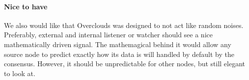 \paragraph{Nice to have} We also would like that Overclouds was designed to not act like random noises. Preferably, external and internal listener or watcher should see a nice mathematically driven signal. The mathemagical behind it would allow any source node to predict exactly how its data is will handled by default by the consensus. However, it should be unpredictable for other nodes, but still elegant to look at.

